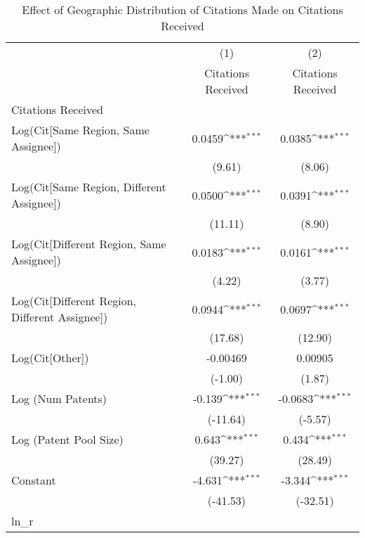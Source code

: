 {
\def\sym#1{\ifmmode^{#1}\else\(^{#1}\)\fi}
\begin{longtable}{l*{2}{c}}
\caption{Effect of Geographic Distribution of Citations Made on Citations Received \label{eflowsreg}}\\
\hline\hline\endfirsthead\hline\endhead\hline\endfoot\endlastfoot
                    &\multicolumn{1}{c}{(1)}&\multicolumn{1}{c}{(2)}\\
                    &\multicolumn{1}{c}{Citations Received}&\multicolumn{1}{c}{Citations Received}\\
\hline
Citations Received  &                     &                     \\
Log(Cit[Same Region, Same Assignee])&      0.0459\sym{***}&      0.0385\sym{***}\\
                    &      (9.61)         &      (8.06)         \\
[1em]
Log(Cit[Same Region, Different Assignee])&      0.0500\sym{***}&      0.0391\sym{***}\\
                    &     (11.11)         &      (8.90)         \\
[1em]
Log(Cit[Different Region, Same Assignee])&      0.0183\sym{***}&      0.0161\sym{***}\\
                    &      (4.22)         &      (3.77)         \\
[1em]
Log(Cit[Different Region, Different Assignee])&      0.0944\sym{***}&      0.0697\sym{***}\\
                    &     (17.68)         &     (12.90)         \\
[1em]
Log(Cit[Other])     &    -0.00469         &     0.00905         \\
                    &     (-1.00)         &      (1.87)         \\
[1em]
Log (Num Patents)   &      -0.139\sym{***}&     -0.0683\sym{***}\\
                    &    (-11.64)         &     (-5.57)         \\
[1em]
Log (Patent Pool Size)&       0.643\sym{***}&       0.434\sym{***}\\
                    &     (39.27)         &     (28.49)         \\
[1em]
Constant            &      -4.631\sym{***}&      -3.344\sym{***}\\
                    &    (-41.53)         &    (-32.51)         \\
\hline
ln\_r                &                     &                     \\

\end{longtable}}
